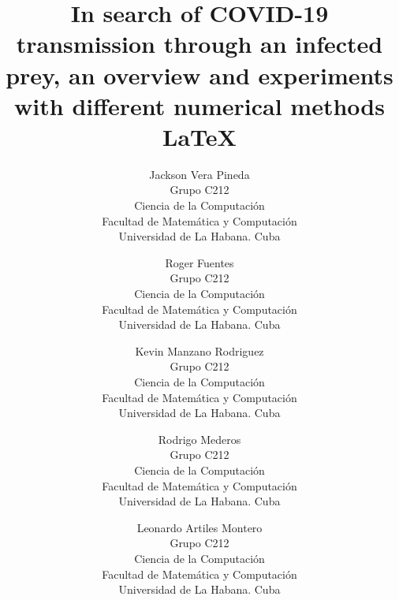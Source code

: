 \documentclass{wscpaperproc}
\theoremstyle{wsc}
\begin{document}
%
%

\title{In search of COVID-19 transmission through an infected prey, an overview and experiments with different numerical methods  \LaTeX}

\author{
Jackson Vera Pineda\\[12pt]
Grupo C212\\
	Ciencia de la Computaci\'on\\
	Facultad de Matem\'atica y Computaci\'on\\
	Universidad de La Habana. Cuba\\
\and
Roger Fuentes\\[12pt]
Grupo C212\\
    Ciencia de la Computaci\'on\\
	Facultad de Matem\'atica y Computaci\'on\\
	Universidad de La Habana. Cuba\\
\and
Kevin Manzano Rodriguez\\[12pt]
Grupo C212\\
	Ciencia de la Computaci\'on\\
	Facultad de Matem\'atica y Computaci\'on\\
	Universidad de La Habana. Cuba\\
\and
Rodrigo Mederos\\[12pt]
Grupo C212\\
	Ciencia de la Computaci\'on\\
	Facultad de Matem\'atica y Computaci\'on\\
	Universidad de La Habana. Cuba\\
\and
Leonardo Artiles Montero\\[12pt]
Grupo C212\\
	Ciencia de la Computaci\'on\\
	Facultad de Matem\'atica y Computaci\'on\\
	Universidad de La Habana. Cuba\\
}
\end{document}
